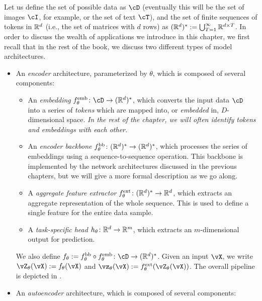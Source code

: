\documentclass[../../book-main.tex]{subfiles}
\begin{document}
Let us define the set of possible data as \(\cD\) (eventually this will be the set of images \(\cI\), for example, or the set of text \(\cT\)), and the set of finite sequences of tokens in \(\mathbb{R}^{d}\) (i.e., the set of matrices with \(d\) rows) as \((\mathbb{R}^{d})^{*} := \bigcup_{T = 1}^{\infty}\mathbb{R}^{d \times T}\). In order to discuss the wealth of applications we introduce in this chapter, we first recall that in the rest of the book, we discuss two different types of model architectures.
\begin{itemize}
    \item An \textit{encoder} architecture, parameterized by \(\theta\), which is composed of several components:
    \begin{itemize}
        \item An \textit{embedding} \(f_{\theta}^{\emb} \colon \cD \to (\R^{d})^{*}\), which converts the input data \(\cD\) into a series of \textit{tokens} which are mapped into, or \textit{embedded} in, \(D\)-dimensional space. \textit{In the rest of the chapter, we will often identify tokens and embeddings with each other.}
        \item An \textit{encoder backbone} \(f_{\theta}^{\mathrm{bb}} \colon (\mathbb{R}^{d})^{*} \to (\mathbb{R}^{d})^{*}\), which processes the series of embeddings using a sequence-to-sequence operation. This backbone is implemented by the network architectures discussed in the previous chapters, but we will give a more formal description as we go along.
        \item A \textit{aggregate feature extractor} \(f_{\theta}^{\mathrm{ext}} \colon (\mathbb{R}^{d})^{*} \to \mathbb{R}^{d}\), which extracts an aggregate representation of the whole sequence. This is used to define a single feature for the entire data sample.
        \item A \textit{task-specific head} \(h_{\theta} \colon \mathbb{R}^{d} \to \mathbb{R}^{m}\), which extracts an \(m\)-dimensional output for prediction.
    \end{itemize}
    We also define \(f_{\theta} := f_{\theta}^{\backbone} \circ f_{\theta}^{\emb} \colon \cD \to (\R^{d})^{*}\). Given an input \(\vX\), we write \(\vZ_{\theta}(\vX) := f_{\theta}(\vX)\) and \(\vz_{\theta}(\vX) := f_{\theta}^{\ext}(\vZ_{\theta}(\vX))\). The overall pipeline is depicted in .
    \item An \textit{autoencoder} architecture, which is composed of several components:

\end{itemize}
\end{document}
